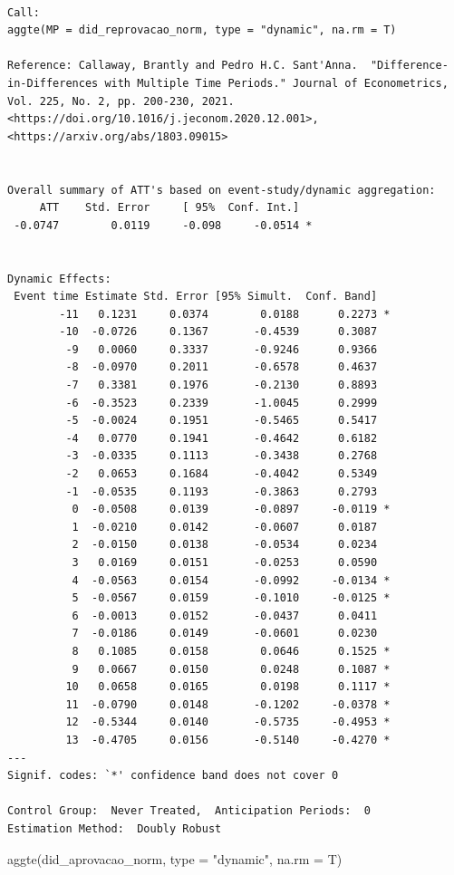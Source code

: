 \documentclass[
  letterpaper,
  DIV=11,
  numbers=noendperiod]{scrartcl}
\newenvironment{Shaded}{\begin{snugshade}}{\end{snugshade}}
\newcommand{\AttributeTok}[1]{\textcolor[rgb]{0.40,0.45,0.13}{#1}}
\newcommand{\FunctionTok}[1]{\textcolor[rgb]{0.28,0.35,0.67}{#1}}
\newcommand{\NormalTok}[1]{\textcolor[rgb]{0.00,0.23,0.31}{#1}}
\newcommand{\StringTok}[1]{\textcolor[rgb]{0.13,0.47,0.30}{#1}}
\begin{document}
\begin{verbatim}

Call:
aggte(MP = did_reprovacao_norm, type = "dynamic", na.rm = T)

Reference: Callaway, Brantly and Pedro H.C. Sant'Anna.  "Difference-in-Differences with Multiple Time Periods." Journal of Econometrics, Vol. 225, No. 2, pp. 200-230, 2021. <https://doi.org/10.1016/j.jeconom.2020.12.001>, <https://arxiv.org/abs/1803.09015> 


Overall summary of ATT's based on event-study/dynamic aggregation:  
     ATT    Std. Error     [ 95%  Conf. Int.]  
 -0.0747        0.0119     -0.098     -0.0514 *


Dynamic Effects:
 Event time Estimate Std. Error [95% Simult.  Conf. Band]  
        -11   0.1231     0.0374        0.0188      0.2273 *
        -10  -0.0726     0.1367       -0.4539      0.3087  
         -9   0.0060     0.3337       -0.9246      0.9366  
         -8  -0.0970     0.2011       -0.6578      0.4637  
         -7   0.3381     0.1976       -0.2130      0.8893  
         -6  -0.3523     0.2339       -1.0045      0.2999  
         -5  -0.0024     0.1951       -0.5465      0.5417  
         -4   0.0770     0.1941       -0.4642      0.6182  
         -3  -0.0335     0.1113       -0.3438      0.2768  
         -2   0.0653     0.1684       -0.4042      0.5349  
         -1  -0.0535     0.1193       -0.3863      0.2793  
          0  -0.0508     0.0139       -0.0897     -0.0119 *
          1  -0.0210     0.0142       -0.0607      0.0187  
          2  -0.0150     0.0138       -0.0534      0.0234  
          3   0.0169     0.0151       -0.0253      0.0590  
          4  -0.0563     0.0154       -0.0992     -0.0134 *
          5  -0.0567     0.0159       -0.1010     -0.0125 *
          6  -0.0013     0.0152       -0.0437      0.0411  
          7  -0.0186     0.0149       -0.0601      0.0230  
          8   0.1085     0.0158        0.0646      0.1525 *
          9   0.0667     0.0150        0.0248      0.1087 *
         10   0.0658     0.0165        0.0198      0.1117 *
         11  -0.0790     0.0148       -0.1202     -0.0378 *
         12  -0.5344     0.0140       -0.5735     -0.4953 *
         13  -0.4705     0.0156       -0.5140     -0.4270 *
---
Signif. codes: `*' confidence band does not cover 0

Control Group:  Never Treated,  Anticipation Periods:  0
Estimation Method:  Doubly Robust
\end{verbatim}

\begin{Shaded}
\begin{Highlighting}[]
\FunctionTok{aggte}\NormalTok{(did\_aprovacao\_norm, }\AttributeTok{type =} \StringTok{"dynamic"}\NormalTok{, }\AttributeTok{na.rm =}\NormalTok{ T)}
\end{Highlighting}
\end{Shaded}
\end{document}
